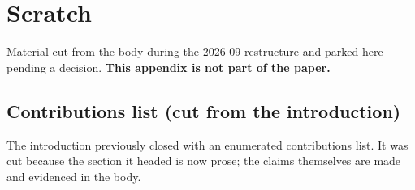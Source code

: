 %

\section{Scratch}
\label{app:scratch}

Material cut from the body during the 2026-09 restructure and parked here
pending a decision. \textbf{This appendix is not part of the paper.}

\subsection{Contributions list (cut from the introduction)}

The introduction previously closed with an enumerated contributions list. It
was cut because the section it headed is now prose; the claims themselves are
made and evidenced in the body.

